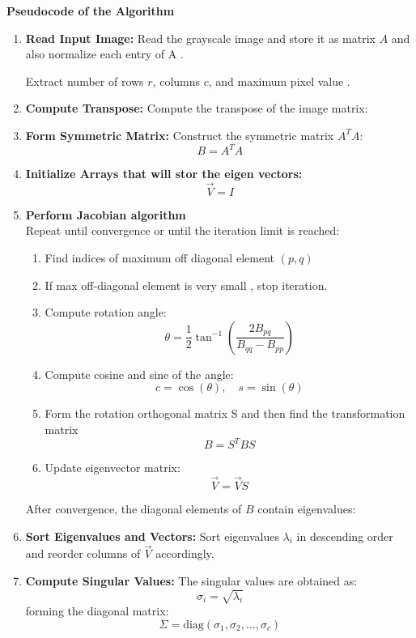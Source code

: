 \documentclass[journal]{IEEEtran}
\begin{document}
\textbf{Pseudocode of the Algorithm}
\begin{enumerate}
    \item \textbf{Read Input Image:}  
    Read the grayscale image and store it as matrix \( A \) and also normalize each entry of A .  
    
    Extract number of rows \( r \), columns \( c \), and maximum pixel value .

    \item \textbf{Compute Transpose:}  
    Compute the transpose of the image matrix:

    \item \textbf{Form Symmetric Matrix:}  
    Construct the symmetric matrix \( A^T A \):
    \[
    B = A^T A
    \]

    \item \textbf{Initialize Arrays that will stor the eigen vectors:}  
    \[
    \vec{V} = I
    \]
   
    \item \textbf{Perform Jacobian algorithm}\\ 
    Repeat until convergence or until the iteration limit is reached:
    \begin{enumerate}
        \item Find indices of maximum off diagonal element \( (p, q) \)
        \item If max off-diagonal element is very small , stop iteration.
        \item Compute rotation angle:
        \[
        \theta = \frac{1}{2} \tan^{-1}\left( \frac{2 B_{pq}}{B_{qq} - B_{pp}} \right)
        \]
        \item Compute cosine and sine of the angle:
        \[
        c = \cos(\theta), \quad s = \sin(\theta)
        \]
        \item Form the rotation orthogonal matrix S and then find the transformation matrix 
        \[
        B = S^T B S
        \]
        \item Update eigenvector matrix:
        \[
        \vec{V} = \vec{V} S
        \]
    \end{enumerate}
    After convergence, the diagonal elements of \( B \) contain eigenvalues:

    \item \textbf{Sort Eigenvalues and Vectors:}  
    Sort eigenvalues \( \lambda_i \) in descending order and reorder columns of \( \vec{V} \) accordingly.

    \item \textbf{Compute Singular Values:}  
    The singular values are obtained as:
    \[
    \sigma_i = \sqrt{\lambda_i}
    \]
    forming the diagonal matrix:
    \[
    \Sigma = \text{diag}(\sigma_1, \sigma_2, \dots, \sigma_c)
    \]


\end{enumerate}
\end{document}
